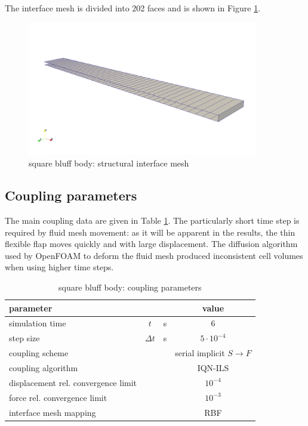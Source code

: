 The interface mesh is divided into 202 faces and is shown in Figure \ref{fig:sq_struct_mesh}. 

\begin{figure}[htbp!]
	\centering
	\includegraphics[width=0.9\textwidth, trim=0 50 0 200, clip]{images/sq-cyl/sq_struct_mesh.png}
	\caption{square bluff body: structural interface mesh}
	\label{fig:sq_struct_mesh}
\end{figure}


\subsection{Coupling parameters}


The main coupling data are given in Table \ref{table:sq-coupling}. The particularly short time step is required by fluid mesh movement: as it will be apparent in the results, the thin flexible flap moves quickly and with large displacement. The diffusion algorithm used by OpenFOAM to deform the fluid mesh produced inconsistent cell volumes when using higher time steps. 

\begin{table}[!htb]
	\begin{center}
		\begin{tabular}{ l c  l| c } 
			parameter & & & value   \\ 
			\hline
			simulation time  & $t$& \si{s} & 6      \\
			step size & $\Delta t$ & \si{s} & $5 \cdot 10^{-4}$   \\
			\hline
			coupling scheme & & & serial implicit  $S\rightarrow F$  \\
			coupling algorithm & & &  IQN-ILS  \\
			displacement rel. convergence limit & & & $10^{-4}$ \\
			force rel. convergence limit &&  & $10^{-3}$  \\
      		interface mesh mapping & & & RBF  \\
			
		\end{tabular}
	\end{center}
	\caption{square bluff body: coupling parameters}
	\label{table:sq-coupling}
\end{table}

